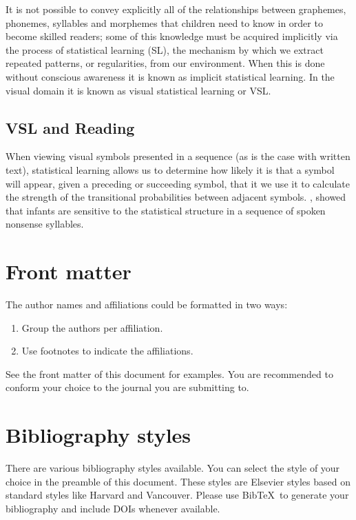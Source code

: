 \documentclass[review]{elsarticle}
\begin{document}
It is not possible to convey explicitly all of the relationships between graphemes, phonemes, syllables and morphemes that children need to know in order to become skilled readers; some of this knowledge must be acquired implicitly via the process of statistical learning (SL), the mechanism by which we extract repeated patterns, or regularities, from our environment.  When this is done without conscious awareness it is known as implicit statistical learning.  In the visual domain it is known as visual statistical learning or VSL. 

\subsection{ VSL and Reading}

When viewing visual symbols presented in a sequence (as is the case with written text), statistical learning allows us to determine how likely it is that a symbol will appear, given a preceding or succeeding symbol, that it we use it to calculate  the strength of the transitional probabilities between adjacent symbols.  \citet{saffran_statistical_1996-1}, showed that  infants are sensitive to the statistical structure in a sequence of spoken nonsense syllables.




\section{Front matter}	

The author names and affiliations could be formatted in two ways:
\begin{enumerate}[(1)]
\item Group the authors per affiliation.
\item Use footnotes to indicate the affiliations.
\end{enumerate}
See the front matter of this document for examples. You are recommended to conform your choice to the journal you are submitting to.

\section{Bibliography styles}

There are various bibliography styles available. You can select the style of your choice in the preamble of this document. These styles are Elsevier styles based on standard styles like Harvard and Vancouver. Please use Bib\TeX\ to generate your bibliography and include DOIs whenever available.





\end{document}
